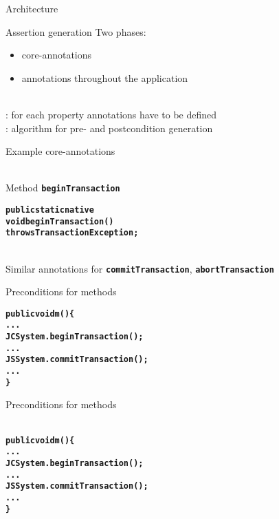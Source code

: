 \documentclass[final,nocolorBG,a4,marieke,nototal,pdf, accumulate,slideColor]{prosper}
\newcommand{\textttbf}[1]{\texttt{\textbf{#1}}}
\begin{document}
\begin{slide}{Architecture}
\end{slide}

\begin{slide}{Assertion generation}
Two phases:
\begin{itemize}
\item {} core-annotations
\item {} annotations throughout the application
\end{itemize}
\ \smallskip\\
: for each property annotations have to be defined
\bigskip\\
: algorithm for pre- and postcondition generation
\end{slide}

\begin{slide}{Example core-annotations}
\begin{alltt}
\end{alltt}
\ \smallskip\\
Method \textttbf{beginTransaction}
\begin{alltt}
\textbf{public static native 
   void beginTransaction() 
        throws TransactionException;}
\end{alltt}
\ \smallskip\\
Similar annotations for \textttbf{commitTransaction},
\textttbf{abortTransaction} 
\end{slide}


\begin{slide}{Preconditions for methods}
\begin{alltt}
\textbf{public void m() \{
   ...
   JCSystem.beginTransaction();
   ...
   JSSystem.commitTransaction();
   ...
   \}}
\end{alltt}
\end{slide}


\begin{slide}{Preconditions for methods}
\vspace*{-1em}
\begin{alltt}
\textbf{}
\textbf{public void m() \{
   ...
   JCSystem.beginTransaction();
   ...
   JSSystem.commitTransaction();
   ...
   \}}
\end{alltt}
\end{slide}
\end{document}
